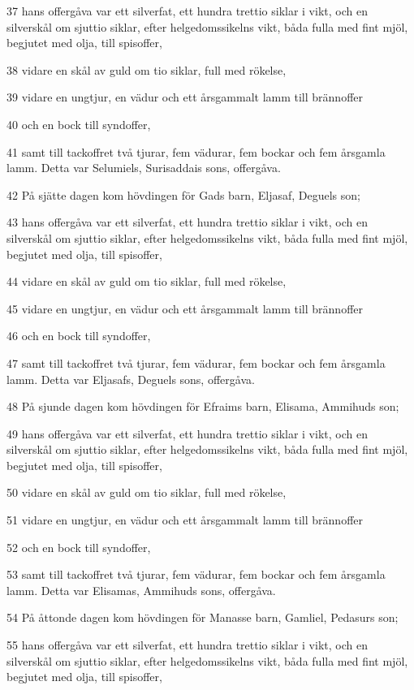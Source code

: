 \par 37 hans offergåva var ett silverfat, ett hundra trettio siklar i vikt, och en silverskål om sjuttio siklar, efter helgedomssikelns vikt, båda fulla med fint mjöl, begjutet med olja, till spisoffer,
\par 38 vidare en skål av guld om tio siklar, full med rökelse,
\par 39 vidare en ungtjur, en vädur och ett årsgammalt lamm till brännoffer
\par 40 och en bock till syndoffer,
\par 41 samt till tackoffret två tjurar, fem vädurar, fem bockar och fem årsgamla lamm. Detta var Selumiels, Surisaddais sons, offergåva.
\par 42 På sjätte dagen kom hövdingen för Gads barn, Eljasaf, Deguels son;
\par 43 hans offergåva var ett silverfat, ett hundra trettio siklar i vikt, och en silverskål om sjuttio siklar, efter helgedomssikelns vikt, båda fulla med fint mjöl, begjutet med olja, till spisoffer,
\par 44 vidare en skål av guld om tio siklar, full med rökelse,
\par 45 vidare en ungtjur, en vädur och ett årsgammalt lamm till brännoffer
\par 46 och en bock till syndoffer,
\par 47 samt till tackoffret två tjurar, fem vädurar, fem bockar och fem årsgamla lamm. Detta var Eljasafs, Deguels sons, offergåva.
\par 48 På sjunde dagen kom hövdingen för Efraims barn, Elisama, Ammihuds son;
\par 49 hans offergåva var ett silverfat, ett hundra trettio siklar i vikt, och en silverskål om sjuttio siklar, efter helgedomssikelns vikt, båda fulla med fint mjöl, begjutet med olja, till spisoffer,
\par 50 vidare en skål av guld om tio siklar, full med rökelse,
\par 51 vidare en ungtjur, en vädur och ett årsgammalt lamm till brännoffer
\par 52 och en bock till syndoffer,
\par 53 samt till tackoffret två tjurar, fem vädurar, fem bockar och fem årsgamla lamm. Detta var Elisamas, Ammihuds sons, offergåva.
\par 54 På åttonde dagen kom hövdingen för Manasse barn, Gamliel, Pedasurs son;
\par 55 hans offergåva var ett silverfat, ett hundra trettio siklar i vikt, och en silverskål om sjuttio siklar, efter helgedomssikelns vikt, båda fulla med fint mjöl, begjutet med olja, till spisoffer,
